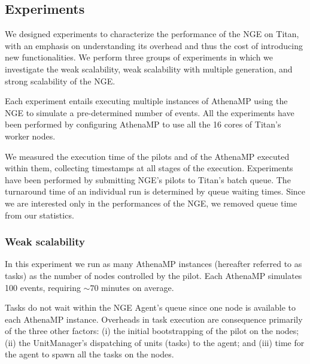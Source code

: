 
\subsection{Experiments}

We designed experiments to characterize the performance of the NGE on Titan,
with an emphasis on understanding its overhead and thus the cost of
introducing new functionalities.  We perform three groups of experiments in
which we investigate the weak scalability, weak scalability with multiple
generation, and strong scalability of the NGE. 

Each experiment entails executing multiple instances of AthenaMP using the NGE
to simulate a pre-determined number of events. All the experiments have been
performed by  configuring AthenaMP to use all the 16 cores  of Titan's worker
nodes.

We  measured the execution time of the pilots and of the AthenaMP  executed
within them, collecting timestamps at  all stages of the execution.
Experiments have been performed  by  submitting NGE's pilots  to Titan's batch
queue.  The turnaround time of an individual run is determined by queue
waiting times. Since we are interested only in the performances of the NGE, we
removed queue time from our statistics.

\subsubsection{Weak scalability}

In this experiment  we run as many AthenaMP instances (hereafter referred to
as tasks)  as the number of nodes controlled by the pilot. Each AthenaMP
simulates 100 events, requiring $\sim 70$ minutes on average. 

Tasks do not  wait within the NGE Agent's queue since  one node  is available
to each AthenaMP instance.  Overheads in task execution are consequence
primarily of the three other factors: (i) the  initial bootstrapping of the
pilot on the nodes; (ii) the UnitManager's dispatching of  units (tasks) to
the agent; and (iii) time for the agent to spawn all the tasks on the nodes.


